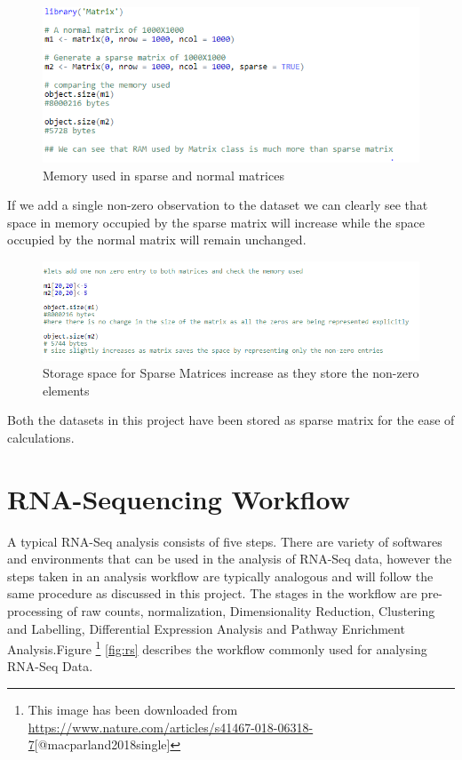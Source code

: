 \documentclass{sydneythesis}
\begin{document}
\begin{figure}

{\centering \includegraphics[width=8.58in]{Sparse1} 

}

\caption{Memory used in sparse and normal matrices}\label{fig:unnamed-chunk-6}
\end{figure}

If we add a single non-zero observation to the dataset we can clearly
see that space in memory occupied by the sparse matrix will increase
while the space occupied by the normal matrix will remain unchanged.

\begin{figure}

{\centering \includegraphics[width=10.92in]{Sparse2} 

}

\caption{Storage space for Sparse Matrices increase as they store the non-zero elements}\label{fig:unnamed-chunk-7}
\end{figure}

Both the datasets in this project have been stored as sparse matrix for
the ease of calculations.

\section{RNA-Sequencing Workflow}\label{rna-sequencing-workflow}

A typical RNA-Seq analysis consists of five steps. There are variety of
softwares and environments that can be used in the analysis of RNA-Seq
data, however the steps taken in an analysis workflow are typically
analogous and will follow the same procedure as discussed in this
project. The stages in the workflow are pre-processing of raw counts,
normalization, Dimensionality Reduction, Clustering and Labelling,
Differential Expression Analysis and Pathway Enrichment Analysis.Figure
\footnote{This image has been downloaded from \url{https://www.nature.com/articles/s41467-018-06318-7}[@macparland2018single]}
\ref{fig:rs} describes the workflow commonly used for analysing RNA-Seq
Data.
\end{document}
